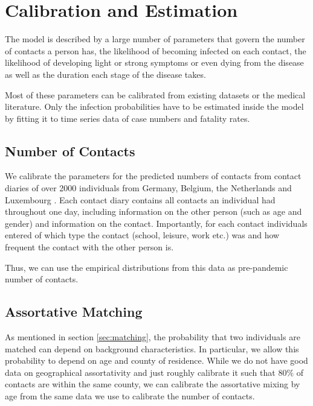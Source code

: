\section{Calibration and Estimation}
\label{sec:calibration_and_estimation}

The model is described by a large number of parameters that govern the number of contacts
a person has, the likelihood of becoming infected on each contact, the likelihood of
developing light or strong symptoms or even dying from the disease as well as the
duration each stage of the disease takes.

Most of these parameters can be calibrated from existing datasets or the medical
literature. Only the infection probabilities have to be estimated inside the model by
fitting it to time series data of case numbers and fatality rates.





\subsection{Number of Contacts}
\label{sub:number_of_contacts}

We calibrate the parameters for the predicted numbers of contacts from contact diaries of
over 2000 individuals from Germany, Belgium, the Netherlands and Luxembourg
\citep{Mossong2008}. Each contact diary contains all contacts an individual had
throughout one day, including information on the other person (such as age and gender)
and information on the contact. Importantly, for each contact individuals entered of
which type the contact (school, leisure, work etc.) was and how frequent the contact with
the other person is.

Thus, we can use the empirical distributions from this data as pre-pandemic number of
contacts.


\FloatBarrier


\subsection{Assortative Matching}

As mentioned in section \ref{sec:matching}, the probability that two individuals are
matched can depend on background characteristics. In particular, we allow this
probability to depend on age and county of residence. While we do not have good data on
geographical assortativity and just roughly calibrate it such that 80\% of contacts are
within the same county, we can calibrate the assortative mixing by age from the same data
we use to calibrate the number of contacts.

